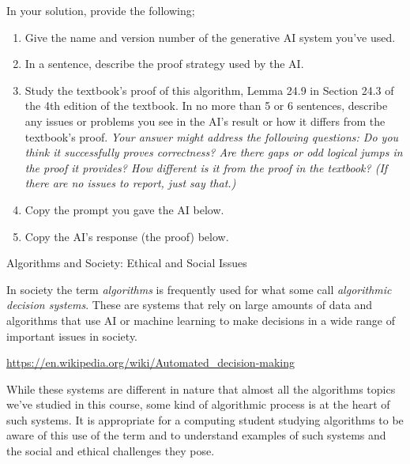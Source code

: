 \documentclass[10pt]{article}
\begin{document}
In your solution, provide the following;
\begin{enumerate}
\item Give the name and version number of the generative AI system you've used.

\soln

\item In a sentence, describe the proof strategy used by the AI.

\soln

\item Study the textbook's proof of this algorithm, Lemma 24.9 in Section 24.3 of the 4th edition of the textbook. In no more than 5 or 6 sentences, describe any issues or problems you see in the AI's result or how it differs from the textbook's proof.  \textit{Your answer might address the following questions: Do you think it successfully proves correctness?  Are there gaps or odd logical jumps in the proof it provides?  How different is it from the proof in the textbook?  (If there are no issues to report, just say that.)}

\soln

\item Copy the prompt you gave the AI below.

\soln

\item Copy the AI's response (the proof) below.

\soln

\end{enumerate}
    


\newpage

\begin{problem} Algorithms and Society: Ethical and Social Issues \end{problem}

In society the term \textit{algorithms} is frequently used for what some call \textit{algorithmic decision systems}.  These are systems that rely on large amounts of data and algorithms that use AI or machine learning to make decisions in a wide range of important issues in society.

\begin{center}
    \url{https://en.wikipedia.org/wiki/Automated_decision-making}
\end{center}

While these systems are different in nature that almost all the algorithms topics we've studied in this course, some kind of algorithmic process is at the heart of such systems. It is appropriate for a computing student studying algorithms to be aware of this use of the term and to understand examples of such systems and the social and ethical challenges they pose.
\end{document}
